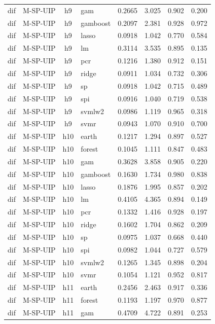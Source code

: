 \begin{ThreePartTable}
\begin{longtable}[t]{llclcccc}
dif & M-SP-UIP & h9 & gam & 0.2665 & 3.025 & 0.902 & 0.200\\
dif & M-SP-UIP & h9 & gamboost & 0.2097 & 2.381 & 0.928 & 0.972\\
dif & M-SP-UIP & h9 & lasso & 0.0918 & 1.042 & 0.770 & 0.584\\
dif & M-SP-UIP & h9 & lm & 0.3114 & 3.535 & 0.895 & 0.135\\
dif & M-SP-UIP & h9 & pcr & 0.1216 & 1.380 & 0.912 & 0.151\\
dif & M-SP-UIP & h9 & ridge & 0.0911 & 1.034 & 0.732 & 0.306\\
dif & M-SP-UIP & h9 & sp & 0.0918 & 1.042 & 0.715 & 0.489\\
dif & M-SP-UIP & h9 & spi & 0.0916 & 1.040 & 0.719 & 0.538\\
dif & M-SP-UIP & h9 & svmlw2 & 0.0986 & 1.119 & 0.965 & 0.318\\
dif & M-SP-UIP & h9 & svmr & 0.0943 & 1.070 & 0.910 & 0.700\\
\addlinespace
dif & M-SP-UIP & h10 & earth & 0.1217 & 1.294 & 0.897 & 0.527\\
dif & M-SP-UIP & h10 & forest & 0.1045 & 1.111 & 0.847 & 0.483\\
dif & M-SP-UIP & h10 & gam & 0.3628 & 3.858 & 0.905 & 0.220\\
dif & M-SP-UIP & h10 & gamboost & 0.1630 & 1.734 & 0.980 & 0.838\\
dif & M-SP-UIP & h10 & lasso & 0.1876 & 1.995 & 0.857 & 0.202\\
dif & M-SP-UIP & h10 & lm & 0.4105 & 4.365 & 0.894 & 0.149\\
dif & M-SP-UIP & h10 & pcr & 0.1332 & 1.416 & 0.928 & 0.197\\
dif & M-SP-UIP & h10 & ridge & 0.1602 & 1.704 & 0.862 & 0.209\\
dif & M-SP-UIP & h10 & sp & 0.0975 & 1.037 & 0.668 & 0.440\\
dif & M-SP-UIP & h10 & spi & 0.0982 & 1.044 & 0.727 & 0.579\\
dif & M-SP-UIP & h10 & svmlw2 & 0.1265 & 1.345 & 0.898 & 0.204\\
dif & M-SP-UIP & h10 & svmr & 0.1054 & 1.121 & 0.952 & 0.817\\
\addlinespace
dif & M-SP-UIP & h11 & earth & 0.2456 & 2.463 & 0.917 & 0.336\\
dif & M-SP-UIP & h11 & forest & 0.1193 & 1.197 & 0.970 & 0.877\\
dif & M-SP-UIP & h11 & gam & 0.4709 & 4.722 & 0.891 & 0.253\\

\end{longtable}
\end{ThreePartTable}
